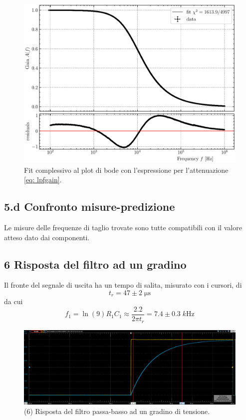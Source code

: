 \documentclass[10pt,a4paper]{article}
\begin{document}
\begin{figure}[H]
\centering
\includegraphics[scale=0.7]{lpfbodefit}
\caption{Fit complessivo al plot di bode con l'espressione per l'attenuazione
\eqref{eq: lpfgain}.\label{fig: lpfbodefit}}
\end{figure}


\subsection*{5.d Confronto misure-predizione}
Le misure delle frequenze di taglio trovate sono tutte compatibili con il valore atteso dato dai componenti.

\subsection*{6 Risposta del filtro ad un gradino}
Il fronte del segnale di uscita ha un tempo di salita, misurato con i cursori, 
di 
\[
t_r = 47 \pm 2 \; \si{\micro\second}
\]
da cui 
\[
f_1 = \ln(9) R_1 C_1 \approx \frac{2.2}{2\pi t_r} = 7.4 \pm 0.3 \; \si{k\Hz}
\]
\begin{figure}[htb]
\centering
\includegraphics[scale=0.35]{rc2k10nF_rise}
\caption{(6) Risposta del filtro passa-basso ad un gradino di tensione.}
\end{figure}
\end{document}
